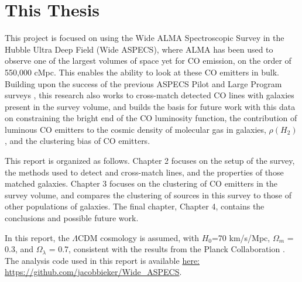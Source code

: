 \documentclass[twoside,single]{lion-msc}
\begin{document}

\section{This Thesis}

This project is focused on using the Wide ALMA Spectroscopic Survey in the Hubble Ultra Deep Field (Wide ASPECS), where ALMA has been used to observe one of the largest volumes of space yet for CO emission, on the order of 550,000 cMpc. This enables the ability to look at these CO emitters in bulk. Building upon the success of the previous ASPECS Pilot and Large Program surveys \cite{walter2016alma, decarli2019alma}, this research also works to cross-match detected CO lines with galaxies present in the survey volume, and builds the basis for future work with this data on constraining the bright end of the CO luminosity function, the contribution of luminous CO emitters to the cosmic density of molecular gas in galaxies, $\rho(H_2)$, and the clustering bias of CO emitters.

This report is organized as follows. Chapter 2 focuses on the setup of the survey, the methods used to detect and cross-match lines, and the properties of those matched galaxies. Chapter 3 focuses on the clustering of CO emitters in the survey volume, and compares the clustering of sources in this survey to those of other populations of galaxies. The final chapter, Chapter 4, contains the conclusions and possible future work. 

In this report, the $\Lambda$CDM cosmology is assumed, with $H_0$=70 km/s/Mpc, $\Omega_m$ = 0.3, and $\Omega_{\lambda}$ = 0.7, consistent with the results from the Planck Collaboration \cite{ade2016planck}. The analysis code used in this report is available \href{https://github.com/jacobbieker/Wide\_ASPECS}{here: https://github.com/jacobbieker/Wide\_ASPECS}. 




\end{document}
